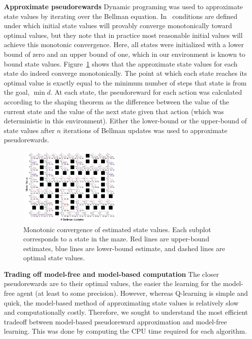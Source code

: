 \documentclass[letterpaper]{article}
\begin{document}
\noindent
\textbf{Approximate pseudorewards} Dynamic programing was used to approximate state values by iterating over the Bellman equation. In~\cite{mcmahan2005bounded} conditions are defined under which initial state values will provably converge monotonically toward optimal values, but they note that in practice most reasonable initial values will achieve this monotonic convergence. Here, all states were initialized with a lower bound of zero and an upper bound of one, which in our environment is known to bound state values. Figure~\ref{fig:value_bounds} shows that the approximate state values for each state do indeed converge monotonically. The point at which each state reaches its optimal value is exactly equal to the minimum number of steps that state is from the goal, $\min{d}$. At each state, the pseudoreward for each action was calculated according to the shaping theorem as the difference between the value of the current state and the value of the next state given that action (which was deterministic in this environment). Either the lower-bound or the upper-bound of state values after $n$ iterations of Bellman updates was used to approximate pseudorewards.

\begin{figure}[ht]
\centering
\includegraphics[width=0.45\textwidth]{value_bounds_labeled}
\caption{Monotonic convergence of estimated state values. Each subplot corresponds to a state in the maze. Red lines are upper-bound estimates, blue lines are lower-bound estimate, and dashed lines are optimal state values.}
\label{fig:value_bounds}
\end{figure}



\noindent
\textbf{Trading off model-free and model-based computation} The closer pseudorewards are to their optimal values, the easier the learning for the model-free agent (at least to some precision). However, whereas Q-learning is simple and quick, the model-based method of approximating state values is relatively slow and computationally costly. Therefore, we sought to understand the most efficient tradeoff between model-based pseudoreward approximation and model-free learning. This was done by computing the CPU time required for each algorithm.
\end{document}
